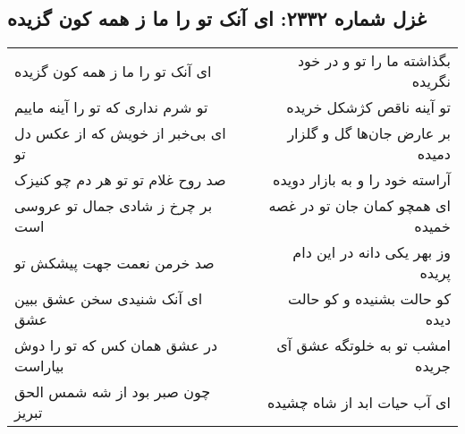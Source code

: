 \begin{center}
\section*{غزل شماره ۲۳۳۲: ای آنک تو را ما ز همه کون گزیده}
\label{sec:2332}
\begin{longtable}{l p{0.5cm} r}
ای آنک تو را ما ز همه کون گزیده
&&
بگذاشته ما را تو و در خود نگریده
\\
تو شرم نداری که تو را آینه ماییم
&&
تو آینه ناقص کژشکل خریده
\\
ای بی‌خبر از خویش که از عکس دل تو
&&
بر عارض جان‌ها گل و گلزار دمیده
\\
صد روح غلام تو تو هر دم چو کنیزک
&&
آراسته خود را و به بازار دویده
\\
بر چرخ ز شادی جمال تو عروسی است
&&
ای همچو کمان جان تو در غصه خمیده
\\
صد خرمن نعمت جهت پیشکش تو
&&
وز بهر یکی دانه در این دام پریده
\\
ای آنک شنیدی سخن عشق ببین عشق
&&
کو حالت بشنیده و کو حالت دیده
\\
در عشق همان کس که تو را دوش بیاراست
&&
امشب تو به خلوتگه عشق آی جریده
\\
چون صبر بود از شه شمس الحق تبریز
&&
ای آب حیات ابد از شاه چشیده
\\
\end{longtable}
\end{center}
